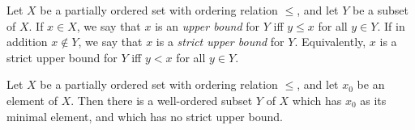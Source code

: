 \begin{defn}\label{i:8.5.12}
  Let \(X\) be a partially ordered set with ordering relation \(\leq\), and let \(Y\) be a subset of \(X\).
  If \(x \in X\), we say that \(x\) is an \emph{upper bound} for \(Y\) iff \(y \leq x\) for all \(y \in Y\).
  If in addition \(x \notin Y\), we say that \(x\) is a \emph{strict upper bound} for \(Y\).
  Equivalently, \(x\) is a strict upper bound for \(Y\) iff \(y < x\) for all \(y \in Y\).
\end{defn}

\setcounter{thm}{13}
\begin{lem}\label{i:8.5.14}
  Let \(X\) be a partially ordered set with ordering relation \(\leq\), and let \(x_0\) be an element of \(X\).
  Then there is a well-ordered subset \(Y\) of \(X\) which has \(x_0\) as its minimal element, and which has no strict upper bound.
\end{lem}

